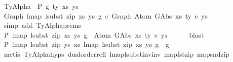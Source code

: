 \begin{isabellebody}
\ {\isacharparenleft}{\kern0pt}TyAlpha\ {\isasymGamma}{}\ P\ g\ ty\ xs{\isacharprime}{\kern0pt}\ ys{\isacharprime}{\kern0pt}{\isacharparenright}{\kern0pt}\isanewline
\ \ \isamarkupfalse%
\ {\isachardoublequoteopen}Graph\ {\isacharparenleft}{\kern0pt}lmap\ {\isacharparenleft}{\kern0pt}lsubst\ {\isacharparenleft}{\kern0pt}zip\ xs{\isacharprime}{\kern0pt}\ ys{\isacharprime}{\kern0pt}{\isacharparenright}{\kern0pt}{\isacharparenright}{\kern0pt}\ g{\isacharparenright}{\kern0pt}\ {\isasymsimeq}e\ Graph\ {\isacharparenleft}{\kern0pt}Atom\ {\isacharparenleft}{\kern0pt}GAbs\ xs\ ty{}{\isacharprime}{\kern0pt}\ e{\isacharprime}{\kern0pt}{\isacharparenright}{\kern0pt}\ ys{\isacharparenright}{\kern0pt}{\isachardoublequoteclose}\isanewline
\ \ \ \ \isamarkupfalse%
\ {\isacharparenleft}{\kern0pt}simp\ add{\isacharcolon}{\kern0pt}\ TyAlpha{\isachardot}{\kern0pt}prems{\isacharparenleft}{\kern0pt}{}{\isacharparenright}{\kern0pt}{\isacharparenright}{\kern0pt}\isanewline
\ \ \isamarkupfalse%
\ \isamarkupfalse%
\ P{}{\isacharcolon}{\kern0pt}\ {\isachardoublequoteopen}lmap\ {\isacharparenleft}{\kern0pt}lsubst\ {\isacharparenleft}{\kern0pt}zip\ xs{\isacharprime}{\kern0pt}\ ys{\isacharprime}{\kern0pt}{\isacharparenright}{\kern0pt}{\isacharparenright}{\kern0pt}\ g\ {\isasymsimeq}\ Atom\ {\isacharparenleft}{\kern0pt}GAbs\ xs\ ty{}{\isacharprime}{\kern0pt}\ e{\isacharprime}{\kern0pt}{\isacharparenright}{\kern0pt}\ ys{\isachardoublequoteclose}\isanewline
\ \ \ \ \isamarkupfalse%
\ blast\isanewline
\isanewline
\ \ \isamarkupfalse%
\ P{}{\isacharcolon}{\kern0pt}\ {\isachardoublequoteopen}lmap\ {\isacharparenleft}{\kern0pt}lsubst\ {\isacharparenleft}{\kern0pt}zip\ ys{\isacharprime}{\kern0pt}\ xs{\isacharprime}{\kern0pt}{\isacharparenright}{\kern0pt}{\isacharparenright}{\kern0pt}\ {\isacharparenleft}{\kern0pt}lmap\ {\isacharparenleft}{\kern0pt}lsubst\ {\isacharparenleft}{\kern0pt}zip\ xs{\isacharprime}{\kern0pt}\ ys{\isacharprime}{\kern0pt}{\isacharparenright}{\kern0pt}{\isacharparenright}{\kern0pt}\ g{\isacharparenright}{\kern0pt}\ {\isacharequal}{\kern0pt}\ g{\isachardoublequoteclose}\isanewline
\ \ \ \ \isamarkupfalse%
\ {\isacharparenleft}{\kern0pt}metis\ TyAlpha{\isachardot}{\kern0pt}hyps{\isacharparenleft}{\kern0pt}{}{\isacharcomma}{\kern0pt}{}{\isacharcomma}{\kern0pt}{}{\isacharcomma}{\kern0pt}{}{\isacharparenright}{\kern0pt}\ dual{\isacharunderscore}{\kern0pt}order{\isachardot}{\kern0pt}refl\ lmap{\isacharunderscore}{\kern0pt}lsubst{\isacharunderscore}{\kern0pt}inv{\isacharunderscore}{\kern0pt}inv\ map{\isacharunderscore}{\kern0pt}fst{\isacharunderscore}{\kern0pt}zip\ map{\isacharunderscore}{\kern0pt}snd{\isacharunderscore}{\kern0pt}zip\isanewline

\end{isabellebody}
